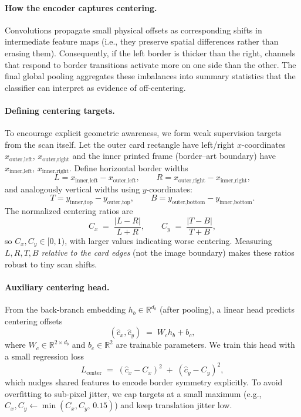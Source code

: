 \documentclass[12pt]{article}
\begin{document}
\paragraph{How the encoder captures centering.}
Convolutions propagate small physical offsets as corresponding shifts in intermediate feature maps (i.e., they preserve spatial differences rather than erasing them). 
Consequently, if the left border is thicker than the right, channels that respond to border transitions activate more on one side than the other. 
The final global pooling aggregates these imbalances into summary statistics that the classifier can interpret as evidence of off-centering.

\paragraph{Defining centering targets.}
To encourage explicit geometric awareness, we form weak supervision targets from the scan itself. 
Let the outer card rectangle have left/right $x$-coordinates $x_{\text{outer,left}}$, $x_{\text{outer,right}}$ and the inner printed frame (border–art boundary) have $x_{\text{inner,left}}$, $x_{\text{inner,right}}$. 
Define horizontal border widths
\[
L \!=\! x_{\text{inner,left}} - x_{\text{outer,left}},\qquad
R \!=\! x_{\text{outer,right}} - x_{\text{inner,right}},
\]
and analogously vertical widths using $y$-coordinates:
\[
T \!=\! y_{\text{inner,top}} - y_{\text{outer,top}},\qquad
B \!=\! y_{\text{outer,bottom}} - y_{\text{inner,bottom}}.
\]
The normalized centering ratios are
\[
C_x \;=\; \frac{|L - R|}{L + R},\qquad
C_y \;=\; \frac{|T - B|}{T + B},
\]
so $C_x,C_y \in [0,1)$, with larger values indicating worse centering. 
Measuring $L,R,T,B$ \emph{relative to the card edges} (not the image boundary) makes these ratios robust to tiny scan shifts.

\paragraph{Auxiliary centering head.}
From the back-branch embedding $h_b \in \mathbb{R}^{d_b}$ (after pooling), a linear head predicts centering offsets
\[
(\hat{c}_x,\hat{c}_y) \;=\; W_c h_b + b_c,
\]
where $W_c \in \mathbb{R}^{2 \times d_b}$ and $b_c \in \mathbb{R}^{2}$ are trainable parameters. 
We train this head with a small regression loss
\[
L_{\text{center}} \;=\; (\hat{c}_x - C_x)^2 \;+\; (\hat{c}_y - C_y)^2,
\]
which nudges shared features to encode border symmetry explicitly. 
To avoid overfitting to sub-pixel jitter, we cap targets at a small maximum (e.g., $C_x,C_y \leftarrow \min(C_x,C_y,\,0.15)$) and keep translation jitter low.
\end{document}

